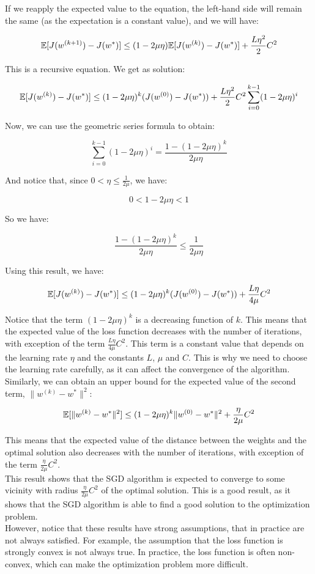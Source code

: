 If we reapply the expected value to the equation, the left-hand side will remain the same (as
the expectation is a constant value), and we will have:

$$\mathbb{E}[J(w^{(k+1)}) - J(w^*)] \leq (1 - 2 \mu \eta) \mathbb{E}[J(w^{(k)}) - J(w^*)] + \frac{L \eta^2}{2} C^2$$

This is a recursive equation. We get as solution:

$$\mathbb{E}[J(w^{(k)}) - J(w^*)] \leq (1 - 2 \mu \eta)^k (J(w^{(0)}) - J(w^*)) + \frac{L \eta^2}{2} C^2 \sum_{i=0}^{k-1} (1 - 2 \mu \eta)^i$$

Now, we can use the geometric series formula to obtain:

$$\sum_{i=0}^{k-1} (1 - 2 \mu \eta)^i = \frac{1 - (1 - 2 \mu \eta)^k}{2 \mu \eta}$$

And notice that, since $0 < \eta \leq \frac{1}{2 \mu}$, we have:

$$0 < 1 - 2 \mu \eta < 1$$

So we have:

$$ \frac{1 - (1 - 2 \mu \eta)^k}{2 \mu \eta} \leq \frac{1}{2 \mu \eta}$$

Using this result, we have:

\begin{equation}
    \mathbb{E}[J(w^{(k)}) - J(w^*)] \leq (1 - 2 \mu \eta)^k (J(w^{(0)}) - J(w^*)) + \frac{L \eta}{4 \mu} C^2
\end{equation}

Notice that the term $(1 - 2 \mu \eta)^k$ is a decreasing function of $k$. This means that the
expected value of the loss function decreases with the number of iterations, with
exception of the term $\frac{L \eta}{4 \mu} C^2$. This term is a constant value that depends on
the learning rate $\eta$ and the constants $L$, $\mu$ and $C$. This is why we need to choose the
learning rate carefully, as it can affect the convergence of the algorithm.\\

Similarly, we can obtain an upper bound for the expected value of the second term, 
$\|w^{(k)} - w^*\|^2$:

\begin{equation}
    \mathbb{E}[\|w^{(k)} - w^*\|^2] \leq (1 - 2 \mu \eta)^k \|w^{(0)} - w^*\|^2 + \frac{\eta}{2\mu} C^2
\end{equation}

This means that the expected value of the distance between the weights and the optimal solution
also decreases with the number of iterations, with exception of the term $\frac{\eta}{2\mu} C^2$.\\

This result shows that the SGD algorithm is expected to converge to some vicinity with radius
$\frac{\eta}{2\mu} C^2$ of the optimal solution. This is a good result, as it shows that the
SGD algorithm is able to find a good solution to the optimization problem.\\

However, notice that these results have strong assumptions, that in practice are not always
satisfied. For example, the assumption that the loss function is strongly convex is not always
true. In practice, the loss function is often non-convex, which can make the optimization problem
more difficult. 
